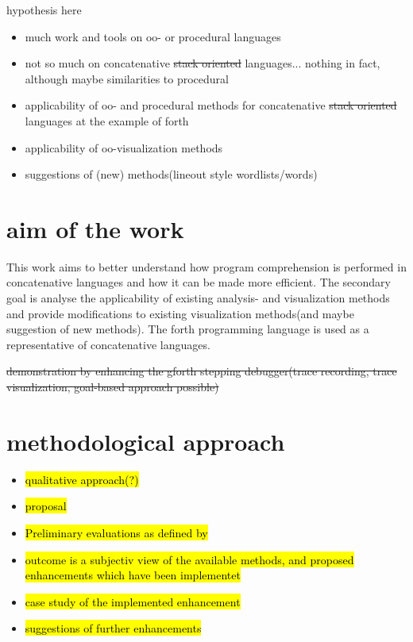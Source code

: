 hypothesis here
\begin{itemize}
\item much work and tools on oo- or procedural languages \cite{Cornelissen:2009:SSP:1638616.1639301}
\item not so much on concatenative \sout{stack oriented} languages... nothing in fact, although maybe similarities to procedural
\item applicability of oo- and procedural methods for concatenative \sout{stack oriented} languages at the example of forth
\item applicability of oo-visualization methods
\item suggestions of (new) methods(lineout style wordlists/words)
\end{itemize}

\section{aim of the work}

This work aims to better understand how program comprehension is performed in concatenative languages and how it can be made more efficient. The secondary goal is analyse the applicability of existing analysis- and visualization methods and provide modifications to existing visualization methods(and maybe suggestion of new methods). The forth programming language is used as a representative of concatenative languages.

\sout{demonstration by enhancing the gforth stepping debugger(trace recording, trace visualization, goal-based approach possible)}

\section{methodological approach}

\begin{itemize}
\item \hl{qualitative approach(?)}
\item \hl{proposal}
\item \hl{Preliminary evaluations as defined by} \cite{Cornelissen:2009:SSP:1638616.1639301}
\item \hl{outcome is a subjectiv view of the available methods, and proposed enhancements which have been implementet}
\item \hl{case study of the implemented enhancement}
\item \hl{suggestions of further enhancements}
\end{itemize}

